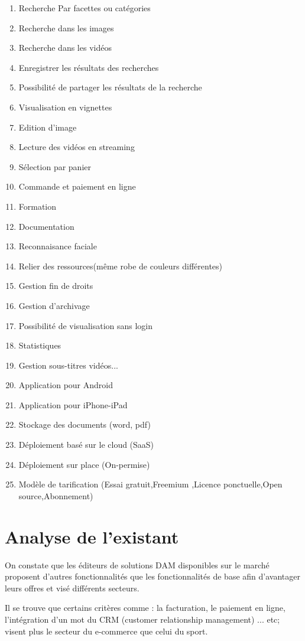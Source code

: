 \begin{enumerate}
\item  Recherche Par facettes ou catégories
\item Recherche dans les images	
\item Recherche dans les vidéos	
\item Enregistrer les résultats	des recherches 
\item Possibilité de partager les résultats	de la recherche
\item Visualisation en vignettes		
\item Edition d'image 
\item Lecture des vidéos en streaming
\item Sélection par panier	
\item Commande et paiement en ligne	
\item Formation 
\item Documentation
\item Reconnaisance faciale
\item Relier des ressources(même robe de couleurs différentes)
\item Gestion fin de droits
\item Gestion d'archivage
\item Possibilité de visualisation sans login
\item Statistiques
\item Gestion sous-titres vidéos...
\item Application pour Android  
\item Application pour  iPhone-iPad
\item Stockage des documents  (word, pdf)
\item Déploiement basé sur le cloud (SaaS)
\item Déploiement sur place (On-permise)
\item Modèle de tarification (Essai gratuit,Freemium ,Licence ponctuelle,Open source,Abonnement)

\end{enumerate}

\newpage
\section{Analyse de l'existant}
On constate que les éditeurs de solutions DAM disponibles sur le marché  proposent d’autres fonctionnalités que les fonctionnalités de base afin d'avantager leurs offres et visé différents secteurs. 

Il se trouve que certains critères comme : la facturation, le paiement en ligne, l'intégration d'un mot du CRM (customer relationship management) ... etc; visent plus le secteur du e-commerce que celui du sport.


